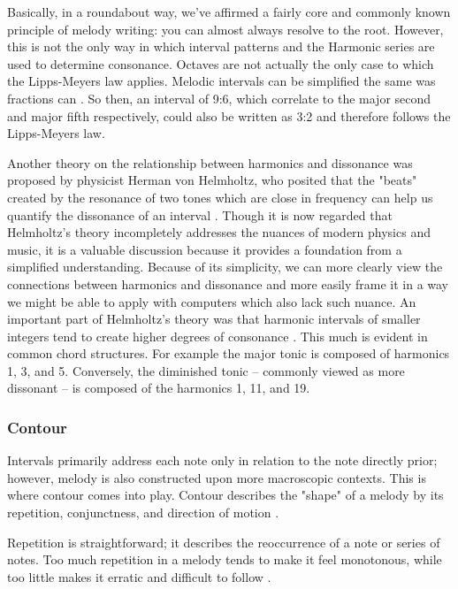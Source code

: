 Basically, in a roundabout way, we've affirmed a fairly core and commonly known principle of
melody writing: you can almost always resolve to the root. However, this is not the only way in
which interval patterns and the Harmonic series are used to determine consonance. Octaves are
not actually the only case to which the Lipps-Meyers law applies. Melodic intervals can be
simplified the same was fractions can \autocite{intervals}. So then, an interval of 9:6, which
correlate to the major second and major fifth respectively, could also be written as 3:2 and
therefore follows the Lipps-Meyers law.

Another theory on the relationship between harmonics and dissonance was proposed by physicist
Herman von Helmholtz, who posited that the "beats" created by the resonance of two tones which are
close in frequency can help us quantify the dissonance of an interval \autocite{intervals}. Though it is now regarded
that Helmholtz's theory incompletely addresses the nuances of modern physics and music, it is
a valuable discussion because it provides a foundation from a simplified understanding. Because
of its simplicity, we can more clearly view the connections between harmonics and dissonance and
more easily frame it in a way we might be able to apply with computers which also lack such nuance.
An important part of Helmholtz's theory was that harmonic intervals of smaller integers tend to
create higher degrees of consonance \autocite{intervals}. This much is evident in common chord
structures. For example the major tonic is composed of harmonics 1, 3, and 5. Conversely, the
diminished tonic -- commonly viewed as more dissonant -- is composed of the harmonics 1, 11, and 19.

\subsubsection{Contour}

Intervals primarily address each note only in relation to the note directly prior; however, melody
is also constructed upon more macroscopic contexts. This is where contour comes into play. Contour
describes the "shape" of a melody by its repetition, conjunctness, and direction of motion
\autocite{contour}.

Repetition is straightforward; it describes the reoccurrence of a note or series of notes. Too much
repetition in a melody tends to make it feel monotonous, while too little makes it erratic and
difficult to follow \autocite{contour}.

